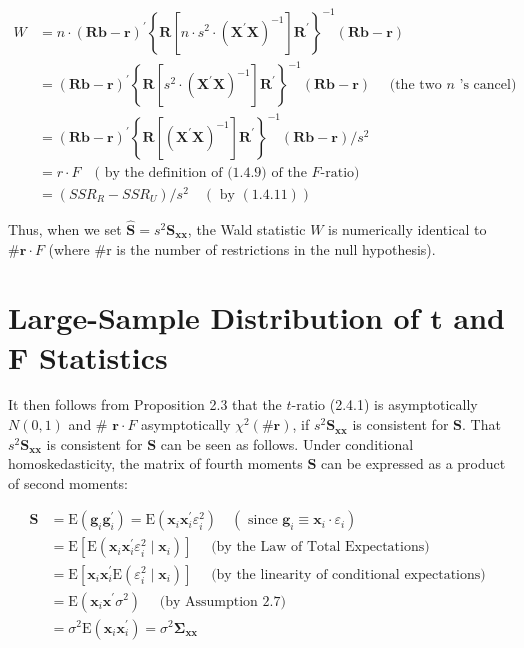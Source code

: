 \documentclass[10pt]{article}
\begin{document}
$$
\begin{aligned}
W & =n \cdot(\mathbf{R} \mathbf{b}-\mathbf{r})^{\prime}\left\{\mathbf{R}\left[n \cdot s^{2} \cdot\left(\mathbf{X}^{\prime} \mathbf{X}\right)^{-1}\right] \mathbf{R}^{\prime}\right\}^{-1}(\mathbf{R} \mathbf{b}-\mathbf{r}) \\
& =(\mathbf{R} \mathbf{b}-\mathbf{r})^{\prime}\left\{\mathbf{R}\left[s^{2} \cdot\left(\mathbf{X}^{\prime} \mathbf{X}\right)^{-1}\right] \mathbf{R}^{\prime}\right\}^{-1}(\mathbf{R} \mathbf{b}-\mathbf{r}) \quad \text { (the two } n \text { 's cancel) } \\
& =(\mathbf{R} \mathbf{b}-\mathbf{r})^{\prime}\left\{\mathbf{R}\left[\left(\mathbf{X}^{\prime} \mathbf{X}\right)^{-1}\right] \mathbf{R}^{\prime}\right\}^{-1}(\mathbf{R} \mathbf{b}-\mathbf{r}) / s^{2} \\
& =r \cdot F \quad(\text { by the definition of (1.4.9) of the } F \text {-ratio) } \\
& =\left(S S R_{R}-S S R_{U}\right) / s^{2} \quad(\text { by }(1.4 .11))
\end{aligned}
$$

Thus, when we set $\widehat{\mathbf{S}}=s^{2} \mathbf{S}_{\mathbf{x x}}$, the Wald statistic $W$ is numerically identical to $\# \mathbf{r} \cdot F$ (where \#r is the number of restrictions in the null hypothesis).

\section*{Large-Sample Distribution of $\boldsymbol{t}$ and $\boldsymbol{F}$ Statistics}
It then follows from Proposition 2.3 that the $t$-ratio (2.4.1) is asymptotically $N(0,1)$ and \# $\mathbf{r} \cdot F$ asymptotically $\chi^{2}(\# \mathbf{r})$, if $s^{2} \mathbf{S}_{\mathbf{x x}}$ is consistent for $\mathbf{S}$. That $s^{2} \mathbf{S}_{\mathbf{x x}}$ is consistent for $\mathbf{S}$ can be seen as follows. Under conditional homoskedasticity, the matrix of fourth moments $\mathbf{S}$ can be expressed as a product of second moments:


\begin{align*}
\mathbf{S} & =\mathrm{E}\left(\mathbf{g}_{i} \mathbf{g}_{i}^{\prime}\right)=\mathrm{E}\left(\mathbf{x}_{i} \mathbf{x}_{i}^{\prime} \varepsilon_{i}^{2}\right) \quad\left(\text { since } \mathbf{g}_{i} \equiv \mathbf{x}_{i} \cdot \varepsilon_{i}\right) \\
& =\mathrm{E}\left[\mathrm{E}\left(\mathbf{x}_{i} \mathbf{x}_{i}^{\prime} \varepsilon_{i}^{2} \mid \mathbf{x}_{i}\right)\right] \quad \text { (by the Law of Total Expectations) } \\
& =\mathrm{E}\left[\mathbf{x}_{i} \mathbf{x}_{i}^{\prime} \mathrm{E}\left(\varepsilon_{i}^{2} \mid \mathbf{x}_{i}\right)\right] \quad \text { (by the linearity of conditional expectations) } \\
& =\mathrm{E}\left(\mathbf{x}_{i} \mathbf{x}^{\prime} \sigma^{2}\right) \quad \text { (by Assumption 2.7) } \\
& =\sigma^{2} \mathrm{E}\left(\mathbf{x}_{i} \mathbf{x}_{i}^{\prime}\right)=\sigma^{2} \mathbf{\Sigma}_{\mathbf{x x}} \tag{2.6.4}
\end{align*}
\end{document}
